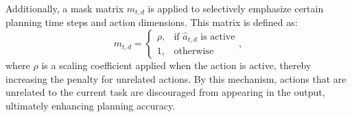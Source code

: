 Additionally, a mask matrix \( m_{t,d} \) is applied to selectively emphasize certain planning time steps and action dimensions. This matrix is defined as:
\begin{equation}
      m_{t,d} = \begin{cases}
    \rho , & \text{if } \hat{a}_{t,d} \text{ is active} \\
    1 , & \text{otherwise}
  \end{cases},
\end{equation}
where \( \rho \) is a scaling coefficient applied when the action is active, thereby increasing the penalty for unrelated actions. By this mechanism, actions that are unrelated to the current task are discouraged from appearing in the output, ultimately enhancing planning accuracy.
